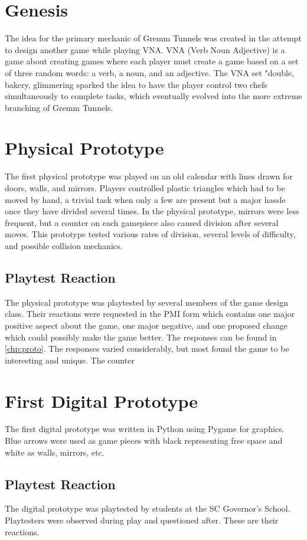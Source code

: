\documentclass{scrreprt}
\begin{document}
		\section{Genesis}
			The idea for the primary mechanic of Gremm Tunnels was created in the attempt to design another game while playing VNA. VNA (Verb Noun Adjective) is a game about creating games where each player must create a game based on a set of three random words: a verb, a noun, and an adjective. The VNA set "double, bakery, glimmering sparked the idea to have the player control two chefs simultaneously to complete tasks, which eventually evolved into the more extreme branching of Gremm Tunnels.
			
		\section{Physical Prototype}
			The first physical prototype was played on an old calendar with lines drawn for doors, walls, and mirrors. Players controlled plastic triangles which had to be moved by hand, a trivial task when only a few are present but a major hassle once they have divided several times. In the physical prototype, mirrors were less frequent, but a counter on each gamepiece also caused division after several moves. This prototype tested various rates of division, several levels of difficulty, and possible collision mechanics.
			
			\subsection{Playtest Reaction}
				The physical prototype was playtested by several members of the game design class. Their reactions were requested in the PMI form which contains one major positive aspect about the game, one major negative, and one proposed change which could possibly make the game better. The responses can be found in \autoref{chp:proto}. The responses varied considerably, but most found the game to be interesting and unique. The counter 
		
		\section{First Digital Prototype}
			The first digital prototype was written in Python using Pygame for graphics. Blue arrows were used as game pieces with black representing free space and white as walls, mirrors, etc.
			
			\subsection{Playtest Reaction}
				The digital prototype was playtested by students at the SC Governor's School. Playtesters were observed during play and questioned after. These are their reactions.
				
\end{document}
